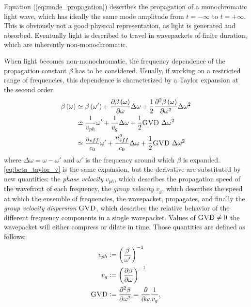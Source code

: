 Equation (\ref{eq:mode_propagation}) describes the propagation of a monochromatic light wave, which has ideally the same mode amplitude from $t=-\infty$ to $t=+\infty$.
This is obviously not a good physical representation, as light is generated and absorbed.
Eventually light is described to travel in wavepackets of finite duration, which are inherently non-monochromatic.

When light becomes non-monochromatic, the frequency dependence of the propagation constant $\beta$ has to be considered.
Usually, if working on a restricted range of frequencies, this dependence is characterized by a Taylor expansion at the second order.
\begin{subequations}
\begin{align}
	\beta\left(\omega\right)
		&\simeq \beta\left(\omega'\right)
						+ \frac{\partial \beta\left(\omega\right) }{\partial \omega} \Delta\omega
						+ \frac{1}{2}\frac{\partial^2 \beta\left(\omega\right) }{\partial \omega^2} \Delta\omega^2
				\label{eq:beta_taylor}\\
		&\simeq \dfrac{1}{v_{ph}} \omega'
						+ \frac{1}{v_g} \Delta\omega
						+ \frac{1}{2} \textsc{GVD}~ \Delta\omega^2
				\label{eq:beta_taylor_v}\\
		&\simeq \dfrac{n_{eff}}{c_0}\omega'
						+ \frac{n_{eff}^g}{c_0} \Delta\omega
						+ \frac{1}{2} \textsc{GVD}~ \Delta\omega^2
				\label{eq:beta_taylor_n}
\end{align}
\end{subequations}
where $\Delta\omega = \omega-\omega'$ and $\omega'$ is the frequency around which $\beta$ is expanded.
\autoref{eq:beta_taylor_v} is the same expansion, but the derivative are substituted by new quantities:
the \textit{phase velocity} $v_{ph}$, which describes the propagation speed of the wavefront of each frequency,
the \textit{group velocity} $v_g$, which describes the speed at which the ensemble of frequencies, the wavepacket, propagates, and finally the \textit{group velocity dispersion} $\textsc{GVD}$, which describes the relative behavior of the different frequency components in a single wavepacket.
Values of $\textsc{GVD} \neq 0 $ the wavepacket will either compress or dilate in time.
Those quantities are defined as follows:
\begin{subequations}
\begin{align}
v_{ph} &\vcentcolon= \left( \dfrac{\beta}{\omega'}\right)^{-1} \\
v_{g}  &\vcentcolon= \left( \dfrac{\partial \beta}{\partial \omega}\right)^{-1} \\
\textsc{GVD} &\vcentcolon= \dfrac{\partial^2\beta}{\partial\omega^2} = \dfrac{\partial}{\partial\omega}\dfrac{1}{v_g}.
\end{align}
\end{subequations}

